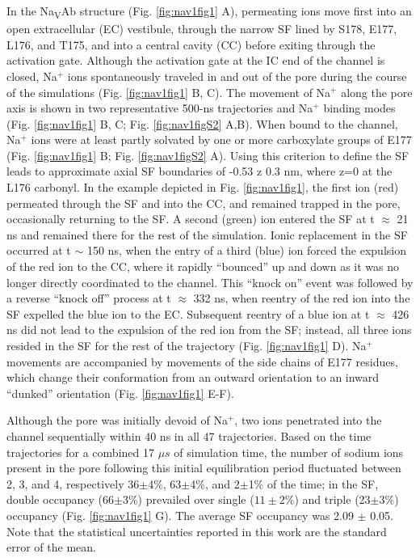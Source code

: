 \begin{refsection}
In the Na\textsubscript{V}Ab structure (Fig. \ref{fig:nav1fig1} A), permeating ions move first into an open extracellular (EC) vestibule, through the narrow SF lined by S178, E177, L176, and T175, and into a central cavity (CC) before exiting through the activation gate.  Although the activation gate at the IC end of the channel is closed, Na$^+$ ions spontaneously traveled in and out of the pore during the course of the simulations (Fig. \ref{fig:nav1fig1} B, C).  The movement of Na$^+$ along the pore axis is shown in two representative 500-ns trajectories and Na$^+$ binding modes (Fig. \ref{fig:nav1fig1} B, C; Fig. \ref{fig:nav1figS2} A,B).  When bound to the channel, Na$^+$ ions were at least partly solvated by one or more carboxylate groups of E177 (Fig. \ref{fig:nav1fig1} B; Fig. \ref{fig:nav1figS2} A).  Using this criterion to define the SF leads to approximate axial SF boundaries of -0.53  z  0.3 nm, where z=0 at the L176 carbonyl.  
In the example depicted in Fig. \ref{fig:nav1fig1}, the first ion (red) permeated through the SF and into the CC, and remained trapped in the pore, occasionally returning to the SF.  A second (green) ion entered the SF at t $\approx$ 21 ns and remained there for the rest of the simulation.  Ionic replacement in the SF occurred at t $\sim$ 150 ns, when the entry of a third (blue) ion forced the expulsion of the red ion to the CC, where it rapidly ``bounced'' up and down as it was no longer directly coordinated to the channel.  This ``knock on'' event was followed by a reverse ``knock off'' process at t $\approx$ 332 ns, when reentry of the red ion into the SF expelled the blue ion to the EC.  Subsequent reentry of a blue ion at t $\approx$ 426 ns did not lead to the expulsion of the red ion from the SF; instead, all three ions resided in the SF for the rest of the trajectory (Fig. \ref{fig:nav1fig1} D).  Na$^+$ movements are accompanied by movements of the side chains of E177 residues, which change their conformation from an outward orientation to an inward ``dunked'' orientation (Fig. \ref{fig:nav1fig1} E-F). 

Although the pore was initially devoid of Na$^+$, two ions penetrated into the channel sequentially within 40 ns in all 47 trajectories.  Based on the time trajectories for a combined 17 $\mu s$ of simulation time, the number of sodium ions present in the pore following this initial equilibration period fluctuated between 2, 3, and 4, respectively 36$\pm$4\%, 63$\pm$4\%, and 2$\pm$1\%  of the time; in the SF, double occupancy (66$\pm$3\%) prevailed over single ($11\pm2\%$) and triple (23$\pm$3\%) occupancy (Fig. \ref{fig:nav1fig1} G).  The average SF occupancy was 2.09 $\pm$ 0.05. Note that the statistical uncertainties reported in this work are the standard error of the mean.


\end{refsection}
